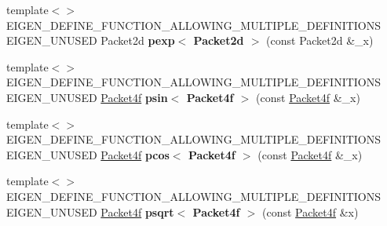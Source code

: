 \begin{DoxyCompactItemize}
\mbox{\label{namespace_eigen_1_1internal_ae5458479b96b74a336076e12227c4f81}} 
{\footnotesize template$<$$>$ }\\E\+I\+G\+E\+N\+\_\+\+D\+E\+F\+I\+N\+E\+\_\+\+F\+U\+N\+C\+T\+I\+O\+N\+\_\+\+A\+L\+L\+O\+W\+I\+N\+G\+\_\+\+M\+U\+L\+T\+I\+P\+L\+E\+\_\+\+D\+E\+F\+I\+N\+I\+T\+I\+O\+NS E\+I\+G\+E\+N\+\_\+\+U\+N\+U\+S\+ED Packet2d {\bfseries pexp$<$ Packet2d $>$} (const Packet2d \&\+\_\+x)
\item 
\mbox{\label{namespace_eigen_1_1internal_af54b550659120e19d75eb1aae81a5496}} 
{\footnotesize template$<$$>$ }\\E\+I\+G\+E\+N\+\_\+\+D\+E\+F\+I\+N\+E\+\_\+\+F\+U\+N\+C\+T\+I\+O\+N\+\_\+\+A\+L\+L\+O\+W\+I\+N\+G\+\_\+\+M\+U\+L\+T\+I\+P\+L\+E\+\_\+\+D\+E\+F\+I\+N\+I\+T\+I\+O\+NS E\+I\+G\+E\+N\+\_\+\+U\+N\+U\+S\+ED \hyperlink{struct_eigen_1_1internal_1_1_packet4f}{Packet4f} {\bfseries psin$<$ Packet4f $>$} (const \hyperlink{struct_eigen_1_1internal_1_1_packet4f}{Packet4f} \&\+\_\+x)
\item 
\mbox{\label{namespace_eigen_1_1internal_ac005cc7410cfba10d4e99a0494df8a9e}} 
{\footnotesize template$<$$>$ }\\E\+I\+G\+E\+N\+\_\+\+D\+E\+F\+I\+N\+E\+\_\+\+F\+U\+N\+C\+T\+I\+O\+N\+\_\+\+A\+L\+L\+O\+W\+I\+N\+G\+\_\+\+M\+U\+L\+T\+I\+P\+L\+E\+\_\+\+D\+E\+F\+I\+N\+I\+T\+I\+O\+NS E\+I\+G\+E\+N\+\_\+\+U\+N\+U\+S\+ED \hyperlink{struct_eigen_1_1internal_1_1_packet4f}{Packet4f} {\bfseries pcos$<$ Packet4f $>$} (const \hyperlink{struct_eigen_1_1internal_1_1_packet4f}{Packet4f} \&\+\_\+x)
\item 
\mbox{\label{namespace_eigen_1_1internal_ae26c604a968200dae48cbffe1971f81a}} 
{\footnotesize template$<$$>$ }\\E\+I\+G\+E\+N\+\_\+\+D\+E\+F\+I\+N\+E\+\_\+\+F\+U\+N\+C\+T\+I\+O\+N\+\_\+\+A\+L\+L\+O\+W\+I\+N\+G\+\_\+\+M\+U\+L\+T\+I\+P\+L\+E\+\_\+\+D\+E\+F\+I\+N\+I\+T\+I\+O\+NS E\+I\+G\+E\+N\+\_\+\+U\+N\+U\+S\+ED \hyperlink{struct_eigen_1_1internal_1_1_packet4f}{Packet4f} {\bfseries psqrt$<$ Packet4f $>$} (const \hyperlink{struct_eigen_1_1internal_1_1_packet4f}{Packet4f} \&x)
\item 
\mbox{\label{namespace_eigen_1_1internal_af266de4f31500421cd72cb689d58949c}} 

\end{DoxyCompactItemize}
